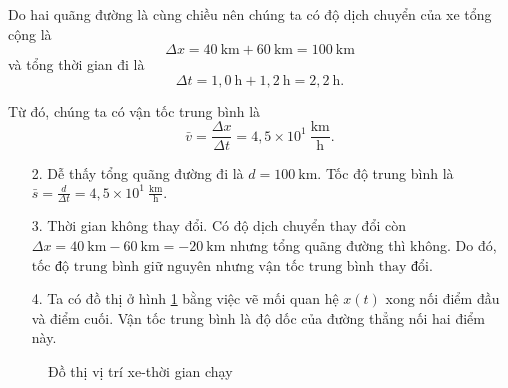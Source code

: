 \documentclass[a4paper, titlepage, openany]{book}
\numberwithin{equation}{chapter}
\begin{document}
Do hai quãng đường là cùng chiều nên chúng ta có độ dịch chuyển của xe tổng cộng là $$\Delta x=40\ \text{km} + 60\ \text{km} = 100\ \text{km}$$ và tổng thời gian đi là $$\Delta t =1{,}0\ \text{h}+1{,}2\ \text{h}=2{,}2\ \text{h}.$$

Từ đó, chúng ta có vận tốc trung bình là $$\bar{v} = \frac{\Delta x}{\Delta t} =\boxed{4{,}5\times10^1\ \frac{\text{km}}{\text{h}}}.$$

\begin{enumerate}
   \item[2.] Dễ thấy tổng quãng đường đi là $d=100\ \text{km}$. Tốc độ trung bình là $\bar{s} = \frac{d}{\Delta t}=\boxed{4{,}5\times10^1\ \frac{\text{km}}{\text{h}}}.$
   \item[3.] Thời gian không thay đổi. Có độ dịch chuyển thay đổi còn $\Delta x = 40\ \text{km} - 60\ \text{km} = -20\ \text{km}$ nhưng tổng quãng đường thì không. Do đó, $\boxed{\text{tốc độ trung bình giữ nguyên}}$ nhưng $\boxed{\text{vận tốc trung bình thay đổi}}$.
   \item[4.] Ta có đồ thị ở hình \ref{fig:do_thi_xe} bằng việc vẽ mối quan hệ $x(t)$ xong nối điểm đầu và điểm cuối. Vận tốc trung bình là độ dốc của đường thẳng nối hai điểm này.
\end{enumerate}

\begin{figure}[h]
   \centering
   \caption{Đồ thị vị trí xe-thời gian chạy}
   \label{fig:do_thi_xe}
\end{figure}
\end{document}
